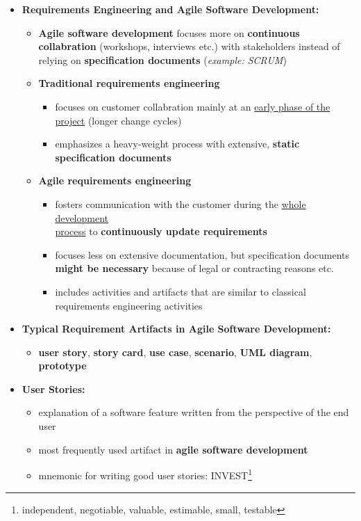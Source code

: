 \documentclass[ieeetran]{article}
\begin{document}
\begin{itemize}
  \item \textbf{Requirements Engineering and Agile Software Development:}
\begin{itemize}
  \item \textbf{Agile software development} focuses more on \textbf{continuous collabration} (workshops, interviews etc.) with stakeholders instead of relying on \textbf{specification documents} (\textit{example: SCRUM})
	  \item \textbf{Traditional requirements engineering}
		  \begin{itemize}
		    \item focuses on customer collabration mainly at an \underline{early phase of the} \underline{project} (longer change cycles)
			   \item emphasizes a heavy-weight process with extensive, \textbf{static specification documents}
				   
		  \end{itemize}


\item \textbf{Agile requirements engineering}
	\begin{itemize}
		\item fosters communication with the customer during the \underline{whole development}\\ \underline{process} to \textbf{continuously update requirements}
		\item focuses less on extensive documentation, but specification documents \textbf{might be necessary} because of legal or contracting reasons etc.
		\item includes activities and artifacts that are similar to classical requirements engineering activities
	\end{itemize}
\end{itemize}

\item \textbf{Typical Requirement Artifacts in Agile Software Development:}
	\begin{itemize}
	  \item \textbf{user story}, \textbf{story card}, \textbf{use case}, \textbf{scenario}, \textbf{UML diagram}, \textbf{prototype}
	\end{itemize}

\item \textbf{User Stories:}
	\begin{itemize}
	  \item explanation of a software feature written from the perspective of the end user
		  \item most frequently used artifact in \textbf{agile software development}
		  \item mnemonic for writing good user stories: INVEST\footnote{independent, negotiable, valuable, estimable, small, testable}
	\end{itemize}


\end{itemize}
\end{document}

